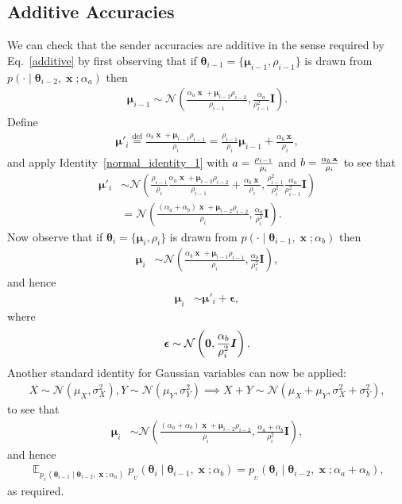 \documentclass[11pt,table]{article}
\DeclareMathOperator*{\E}{\mathbb{E}}
\DeclareMathOperator{\x}{\mathbf{x}}
\newcommand{\pt}[1]{\rho_{#1}}
\newcommand{\mt}[1]{\boldsymbol{\mu}_{#1}}
\newcommand{\N}[2]{\mathcal{N}\left(#1 , #2\right)}
\newcommand{\I}[1]{\boldsymbol{I}}
\newcommand*{\defeq}{\stackrel{\text{def}}{=}}
\newcommand{\tidx}[2]{#1_{#2}}
\renewcommand{\vec}[1]{\boldsymbol{#1}}
\newcommand{\pars}{\theta}
\newcommand{\parsn}{\vec{\pars}}
\newcommand{\parsnt}[1]{\tidx{\parsn}{#1}}
\newcommand{\0}[1]{\constvec{0}{#1}}
\newcommand{\1}[1]{\constvec{1}{#1}}
\newcommand{\update}{p_{_U}}
\begin{document}
\subsection{Additive Accuracies}\label{sec:cts_additive}
We can check that the sender accuracies are additive in the sense required by Eq.~\ref{additive} by first observing that if $\parsnt{i-1} = \{\mt{i-1}, \pt{i-1}\}$ is drawn from $p(\cdot \mid \parsnt{i-2}, \x; \alpha_a)$ then
\begin{align}
\mt{i-1} \sim \N{\frac{\alpha_a \x + \mt{i-2}\pt{i-2}}{\pt{i-1}}}{\frac{\alpha_a}{\pt{i-1}^2}\I{D}}.
\end{align}
Define
\begin{align}
\boldsymbol{\mu}'_i \defeq \frac{\alpha_b \x + \mt{i-1}\pt{i-1}}{\pt{i}} = \frac{\pt{i-1}}{\pt{i}}\mt{i-1} + \frac{\alpha_b \x}{\pt{i}},
\end{align}
and apply Identity~\ref{normal_identity_1} with $a = \smash{\frac{\pt{i-1}}{\pt{i}}}$ and $b = \smash{\frac{\alpha_b\x}{\pt{i}}}$ to see that
\begin{align}
\boldsymbol{\mu}'_i  & \sim \N{\frac{\pt{i-1}}{\pt{i}}\frac{\alpha_a \x + \mt{i-2}\pt{i-2}}{\pt{i-1}} + \frac{\alpha_b \x}{\pt{i}}}{\frac{\pt{i-1}^2}{\pt{i}^2}\frac{\alpha_a}{\pt{i-1}^2}\I{D}}\\
&= \N{\frac{(\alpha_a + \alpha_b) \x + \mt{i-2}\pt{i-2}}{\pt{i}}}{\frac{\alpha_a}{\pt{i}^2}\I{D}}.
\end{align}
Now observe that if $\parsnt{i} = \{\mt{i}, \pt{i}\}$ is drawn from $p(\cdot \mid \parsnt{i-1}, \x; \alpha_b)$ then
\begin{align}
\mt{i} &\sim \N{\frac{\alpha_b \x + \mt{i-1}\pt{i-1}}{\pt{i}}}{\frac{\alpha_b}{\pt{i}^2}\I{D}},
\end{align}
and hence
\begin{align}
\mt{i} &\sim \boldsymbol{\mu}'_i + \vec{\epsilon},
\end{align}
where
\begin{align}
\vec{\epsilon} \sim \N{\0{D}}{\frac{\alpha_b}{\pt{i}^2}\I{D}}.
\end{align}
Another standard identity for Gaussian variables can now be applied:
\begin{align}
X \sim \N{\mu_X}{\sigma^2_X}, Y \sim \N{\mu_Y}{\sigma^2_Y} \implies X+Y \sim \N{\mu_X + \mu_Y}{\sigma^2_X+\sigma^2_Y}\label{normal_identity_2},
\end{align}
to see that 
\begin{align}
\mt{i} &\sim \N{\frac{(\alpha_a + \alpha_b) \x + \mt{i-2}\pt{i-2}}{\pt{i}}}{\frac{\alpha_a + \alpha_b}{\pt{i}^2}\I{D}},
\end{align}
and hence
\begin{align}
\E_{\update(\parsnt{i-1}\mid \parsnt{i-2}, \x; \alpha_a)} \update(\parsnt{i} \mid \parsnt{i-1}, \x; \alpha_b) =  \update(\parsnt{i} \mid \parsnt{i-2}, \x; \alpha_a + \alpha_b),
\end{align}
as required. 
\end{document}
